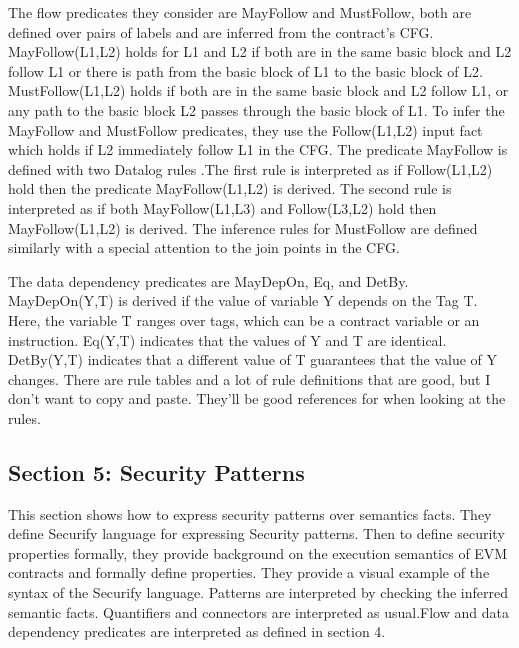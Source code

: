\documentclass{article}
\begin{document}
The flow predicates they consider are MayFollow and MustFollow, both are defined over pairs of labels and are inferred from the contract's CFG. MayFollow(L1,L2) holds for L1 and L2 if both are in the same basic block and L2 follow L1 or there is path from the basic block of L1 to the basic block of L2. MustFollow(L1,L2) holds if both are in the same basic block and L2 follow L1, or any path to the basic block L2 passes through the basic block of L1. To infer the MayFollow and MustFollow predicates, they use the Follow(L1,L2) input fact which holds if L2 immediately follow L1 in the CFG. The predicate MayFollow is defined with two Datalog rules .The first rule is interpreted as if Follow(L1,L2) hold then the predicate MayFollow(L1,L2) is derived. The second rule is interpreted as if both MayFollow(L1,L3) and Follow(L3,L2) hold then MayFollow(L1,L2) is derived. The inference rules for MustFollow are defined similarly with a special attention to the join points in the CFG.

The data dependency predicates are MayDepOn, Eq, and DetBy. MayDepOn(Y,T) is derived if the value of variable Y depends on the Tag T. Here, the variable T ranges over tags, which can be a contract variable or an instruction. Eq(Y,T) indicates that the values of Y and T are identical. DetBy(Y,T) indicates that a different value of T guarantees that the value of Y changes. There are rule tables and a lot of rule definitions that are good, but I don't want to copy and paste. They'll be good references for when looking at the rules.

\subsection{Section 5: Security Patterns}

This section shows how to express security patterns over semantics facts. They define Securify language for expressing Security patterns. Then to define security properties formally, they provide background on the execution semantics of EVM contracts and formally define properties. They provide a visual example of the syntax of the Securify language. Patterns are interpreted by checking the inferred semantic facts. Quantifiers and connectors are interpreted as usual.Flow and data dependency predicates are interpreted as defined in section 4. 
\end{document}
